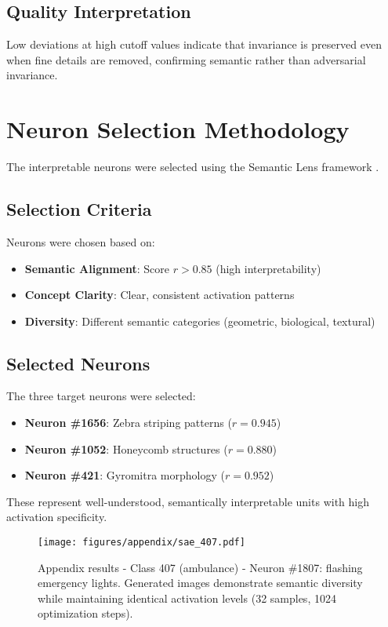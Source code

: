 \subsection{Quality Interpretation}

Low deviations at high cutoff values indicate that invariance is preserved even when fine details are removed, confirming semantic rather than adversarial invariance.

\section{Neuron Selection Methodology}\label{appendix:neuron_selection}

The interpretable neurons were selected using the Semantic Lens framework \citep{dreyer2025mechanisticunderstandingvalidationlarge}.

\subsection{Selection Criteria}

Neurons were chosen based on:
\begin{itemize}
\item \textbf{Semantic Alignment}: Score $r > 0.85$ (high interpretability)
\item \textbf{Concept Clarity}: Clear, consistent activation patterns
\item \textbf{Diversity}: Different semantic categories (geometric, biological, textural)
\end{itemize}

\subsection{Selected Neurons}

The three target neurons were selected:
\begin{itemize}
\item \textbf{Neuron \#1656}: Zebra striping patterns ($r = 0.945$)
\item \textbf{Neuron \#1052}: Honeycomb structures ($r = 0.880$)
\item \textbf{Neuron \#421}: Gyromitra morphology ($r = 0.952$)
\end{itemize}

These represent well-understood, semantically interpretable units with high activation specificity.


\begin{figure}[p]
  \centering
  \texttt{[image: figures/appendix/sae\_407.pdf]}
  \caption{Appendix results - Class 407 (ambulance) - Neuron \#1807: flashing emergency lights. Generated images demonstrate semantic diversity while maintaining identical activation levels (32 samples, 1024 optimization steps).}
  \label{fig:appendix_407}
\end{figure}

